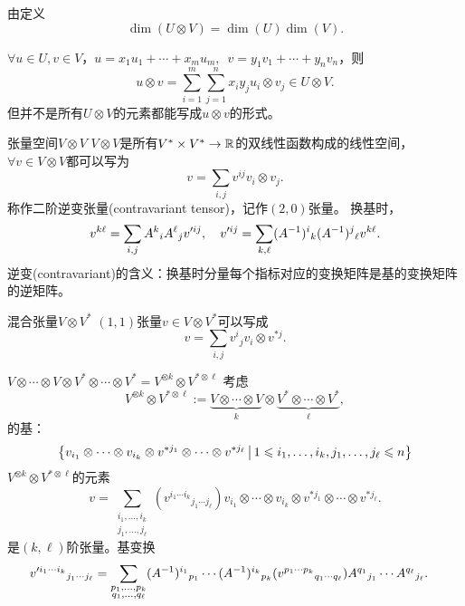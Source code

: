 \begin{corollary}
	由定义 
	\[
		\dim(U\otimes V)=\dim(U)\dim(V).
	\]
\end{corollary}
\begin{example}{}{}
	$\forall u\in U,v\in V$，$u=x_1u_1+\cdots+x_mu_m,\enspace v=y_1v_1+\cdots+y_nv_n$，则 
	\[
		u\otimes v=\sum_{i=1}^m\sum_{j=1}^nx_iy_ju_i\otimes v_j\in U\otimes V.
	\]
	但并不是所有$U\otimes V$的元素都能写成$u\otimes v$的形式。
\end{example}
\begin{example}{张量空间$V\otimes V$}{}
	$V\otimes V$是所有$V^\ast\times V^\ast\to\mathbb R$的双线性函数构成的线性空间，%
	$\forall v\in V\otimes V$都可以写为
	\[
		v=\sum_{i,j}v^{ij}v_i\otimes v_j.
	\]
	称作二阶逆变张量(contravariant tensor)，记作$(2,0)$张量。
	\tcblower
	换基时，
	\[
		v^{k\ell}=\sum_{i,j}A^k{}_iA^\ell{}_jv'^{ij},\quad v'^{ij}=\sum_{k,\ell}(A^{-1})^i{}_k(A^{-1})^j{}_\ell v^{k\ell}.
	\]
	逆变(contravariant)的含义：换基时分量每个指标对应的变换矩阵是基的变换矩阵的逆矩阵。
\end{example}
\begin{example}{混合张量$V\otimes V^\ast$}{}
	$(1,1)$张量$v\in V\otimes V^\ast$可以写成
	\[
		v=\sum_{i,j}v^i{}_jv_i\otimes v^{\ast j}.
	\]
\end{example}
\begin{example}{$V\otimes\cdots\otimes V\otimes V^\ast\otimes\cdots\otimes V^\ast=V^{\otimes k}\otimes V^{\ast\otimes\ell}$}{}
	考虑
	\[
		V^{\otimes k}\otimes V^{\ast\otimes\ell}:=\underbrace{V\otimes\cdots\otimes V}_k\otimes\underbrace{V^\ast\otimes\cdots\otimes V^\ast}_\ell,
	\]
	的基： 
	\[
		\left\{v_{i_1}\otimes\cdots\otimes v_{i_k}\otimes v^{\ast j_1}\otimes\cdots\otimes v^{\ast j_\ell}\,\middle\vert\,1\leqslant i_1,\ldots,i_k,j_1,\ldots,j_\ell\leqslant n\right\}
	\]
	$V^{\otimes k}\otimes V^{\ast\otimes\ell}$的元素 
	\[
		v=\sum_{\substack{i_1,\ldots,i_k\\j_1,\ldots,j_\ell}}(v^{i_1\cdots i_k}{}_{j_1\cdots j_\ell})v_{i_1}\otimes\cdots\otimes v_{i_k}\otimes v^{\ast j_1}\otimes\cdots\otimes v^{\ast j_\ell}.
	\]
	是$(k,\ell)$阶张量。基变换
	\begin{align*}
		&v'^{i_1\cdots i_k}{}_{j_1\cdots j_\ell}=\sum_{\substack{p_1,\ldots,p_k\\q_1,\ldots,q_\ell}}(A^{-1})^{i_1}{}_{p_1}\cdots(A^{-1})^{i_k}{}_{p_k}(v^{p_1\cdots p_k}{}_{q_1\cdots q_\ell})A^{q_1}{}_{j_1}\cdots A^{q_\ell}{}_{j_\ell}.
	\end{align*}
\end{example}